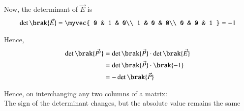 \documentclass[journal]{IEEEtran}
\begin{document}
Now, the determinant of $\vec{E}$ is
\begin{align}
\det\brak{\vec{E}} 
= 
\myvec{
0 & 1 & 0\\
1 & 0 & 0\\
0 & 0 & 1
}
= -1
\end{align}

Hence,
\begin{align}
\det\brak{\vec{P'}} 
&= \det\brak{\vec{P}} \cdot \det\brak{\vec{E}} \\
&= \det\brak{\vec{P}} \cdot \brak{-1} \\
&= -\det\brak{\vec{P}}
\end{align}

Hence, on interchanging any two columns of a matrix:\\
The sign of the determinant changes, but the absolute value remains the same
\end{document}

